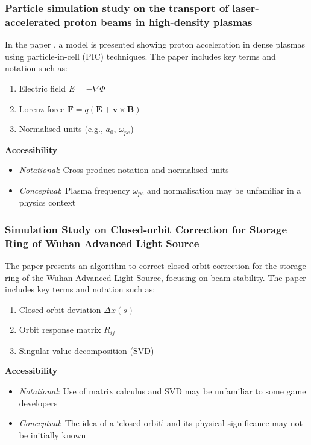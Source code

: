 \subsubsection*{Particle simulation study on the transport of laser-accelerated proton beams in high-density plasmas}

In the paper , a model is presented showing proton acceleration in dense plasmas using particle-in-cell (PIC) techniques.
The paper includes key terms and notation such as:

\begin{enumerate}
    \item Electric field $E = -\nabla\Phi$
    \item Lorenz force $\mathbf{F}=q(\mathbf{E}+\mathbf{v}\times\mathbf{B})$
    \item Normalised units (e.g., $a_0$, $\omega_{pe}$)
\end{enumerate}

\textbf{Accessibility}

\begin{itemize}
    \item \emph{Notational}: Cross product notation and normalised units
    \item \emph{Conceptual}: Plasma frequency $\omega_{pe}$ and normalisation may be unfamiliar in a physics context
\end{itemize}

\subsubsection*{Simulation Study on Closed-orbit Correction for Storage Ring of Wuhan Advanced Light Source}

The paper  presents an algorithm to correct closed-orbit correction for the storage ring of the Wuhan Advanced Light Source, focusing on beam stability.
The paper includes key terms and notation such as:

\begin{enumerate}
    \item Closed-orbit deviation $\Delta x(s)$
    \item Orbit response matrix $R_{ij}$
    \item Singular value decomposition (SVD)
\end{enumerate}

\textbf{Accessibility}

\begin{itemize}
    \item \emph{Notational}: Use of matrix calculus and SVD may be unfamiliar to some game developers
    \item \emph{Conceptual}: The idea of a `closed orbit' and its physical significance may not be initially known
\end{itemize}

